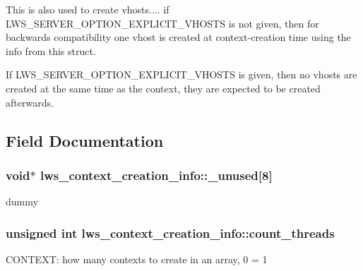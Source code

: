 This is also used to create vhosts.... if L\+W\+S\+\_\+\+S\+E\+R\+V\+E\+R\+\_\+\+O\+P\+T\+I\+O\+N\+\_\+\+E\+X\+P\+L\+I\+C\+I\+T\+\_\+\+V\+H\+O\+S\+TS is not given, then for backwards compatibility one vhost is created at context-\/creation time using the info from this struct.

If L\+W\+S\+\_\+\+S\+E\+R\+V\+E\+R\+\_\+\+O\+P\+T\+I\+O\+N\+\_\+\+E\+X\+P\+L\+I\+C\+I\+T\+\_\+\+V\+H\+O\+S\+TS is given, then no vhosts are created at the same time as the context, they are expected to be created afterwards. 

\subsection{Field Documentation}
\subsubsection[{\texorpdfstring{\+\_\+unused}{\_unused}}]{\setlength{\rightskip}{0pt plus 5cm}void$\ast$ lws\+\_\+context\+\_\+creation\+\_\+info\+::\+\_\+unused\mbox{[}8\mbox{]}}\hypertarget{structlws__context__creation__info_afce3b59950eca3203faa07381bbed5d7}{}\label{structlws__context__creation__info_afce3b59950eca3203faa07381bbed5d7}
dummy 
\subsubsection[{\texorpdfstring{count\+\_\+threads}{count\_threads}}]{\setlength{\rightskip}{0pt plus 5cm}unsigned int lws\+\_\+context\+\_\+creation\+\_\+info\+::count\+\_\+threads}\hypertarget{structlws__context__creation__info_ae52f3237e144e9ddcab5e2cf91d1e419}{}\label{structlws__context__creation__info_ae52f3237e144e9ddcab5e2cf91d1e419}
C\+O\+N\+T\+E\+XT\+: how many contexts to create in an array, 0 = 1 
